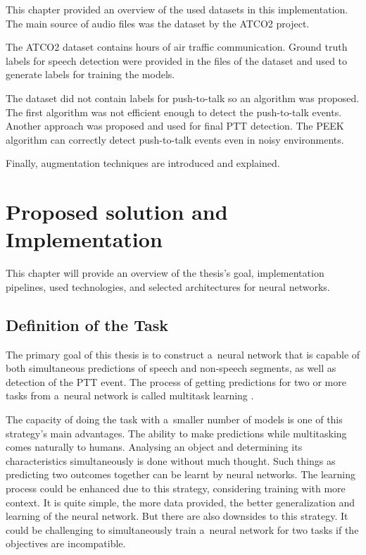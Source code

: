     \newpage

    This chapter provided an overview of the used datasets in this implementation. The main source of audio files was the dataset by the ATCO2 project.

    The ATCO2 dataset contains hours of air traffic communication. Ground truth labels for speech detection were provided in the files of the dataset and used to generate labels for training the models.
    
    The dataset did not contain labels for push-to-talk so an algorithm was proposed. The first algorithm was not efficient enough to detect the push-to-talk events. Another approach was proposed and used for final PTT detection. The PEEK algorithm can correctly detect push-to-talk events even in noisy environments. 

    Finally, augmentation techniques are introduced and explained. 


    
    

\chapter{Proposed solution and Implementation}\label{Implementation}

    This chapter will provide an overview of the thesis's goal, implementation pipelines, used technologies, and selected architectures for neural networks.

\section{Definition of the Task}

    The primary goal of this thesis is to construct a~neural network that is capable of both simultaneous predictions of speech and non-speech segments, as well as detection of the PTT event. 
    The process of getting predictions for two or more tasks from a~neural network is called multitask learning \cite{DBLP:journals/corr/abs-2009-09796}. 

    The capacity of doing the task with a~smaller number of models is one of this strategy's main advantages. The ability to make predictions while multitasking comes naturally to humans. Analysing an object and determining its characteristics simultaneously is done without much thought.
    Such things as predicting two outcomes together can be learnt by neural networks.
    The learning process could be enhanced due to this strategy, considering training with more context.
    It is quite simple, the more data provided, the better generalization and learning of the neural network.
    But there are also downsides to this strategy. It could be challenging to simultaneously train a~neural network for two tasks if the objectives are incompatible. 


